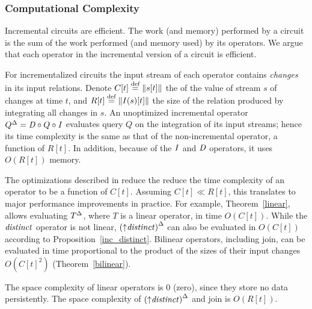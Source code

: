 \subsubsection{Computational Complexity}\label{sec:relational-complexity}

Incremental circuits are efficient.  The work (and memory) performed by a circuit
is the sum of the work performed (and memory used) by its operators.
We argue that each operator in the incremental version of a circuit is efficient.

For incrementalized circuits the input stream of each operator contains \emph{changes} in
its input relations.  Denote $C[t] \stackrel{\textrm{\scriptsize def}}{=} \| s[t] \|$ the 
of the value of stream $s$ of changes at time $t$, and $R[t] \stackrel{\textrm{\scriptsize def}}{=}
\| \mathit{I}(s)[t] \|$ the size of the relation produced by integrating all changes in
$s$.  An unoptimized incremental operator ${Q}^{\Delta} = \mathit{D} \circ Q \circ \mathit{I}$
evaluates query $Q$ on the integration of its input streams; hence its time
complexity  is the same as that of the non-incremental operator, a function of
$R[t]$.  In addition, because of the $\mathit{I}$ and $\mathit{D}$ operators, it uses $O(R[t])$ memory.

The optimizations described in  reduce the
reduce the time complexity of an operator to be a function of $C[t]$.  Assuming $C[t] \ll
R[t]$, this translates to major performance improvements in practice.  For
example, Theorem~\ref{linear}, allows evaluating ${T}^{\Delta}$, where $T$ is a
linear operator, in time $O(C[t])$.  While the $\mathit{distinct}$ operator is not
linear, ${({\uparrow}\mathit{distinct})}^{\Delta}$ can also be evaluated in $O(C[t])$ according to
Proposition~\ref{inc_distinct}.  Bilinear operators, including join, can be
evaluated in time proportional to the product of the sizes of their input
changes $O(C[t]^2)$ (Theorem~\ref{bilinear}).  

The space complexity of linear operators is 0 (zero), since they store no
data persistently.  The space complexity of ${({\uparrow}\mathit{distinct})}^{\Delta}$ and 
join is $O(R[t])$.